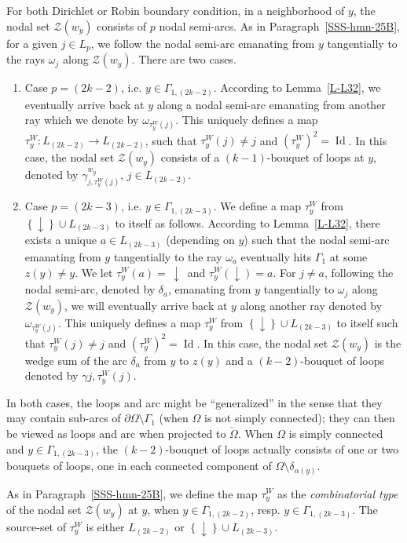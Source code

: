 \documentclass[12pt,a4paper]{amsart}
\theoremstyle{plain} %
\theoremstyle{definition}
\numberwithin{equation}{section}
\numberwithin{figure}{section}
\numberwithin{table}{section}
\newcommand{\cZ}{\mathcal{Z}}
\DeclareMathOperator{\id}{Id}
\newcommand{\sm}{\!\setminus\!}
\newcommand{\set}[1]{\left\lbrace #1 \right\rbrace}
\begin{document}
For both Dirichlet or Robin boundary condition, in a neighborhood of $y$,
the nodal set $\cZ(w_y)$ consists of $p$ nodal semi-arcs. As in Paragraph~\ref{SSS-hmn-25B}, for a given $j \in L_p$, we follow the
nodal semi-arc emanating from $y$ tangentially to the rays $\omega_j$
along $\cZ(w_y)$.  There are two cases.
\begin{enumerate}[$\diamond$]
\item Case $p=(2k-2)$, i.e. $y \in \Gamma_{1,(2k -2)}$. According to Lemma~\ref{L-L32}, we eventually arrive back at $y$ along a nodal semi-arc emanating from another ray which we denote by $\omega_{\tau_y^{W}(j)}$. This uniquely defines a map $\tau_y^{W} : L_{(2k-2)} \to L_{(2k-2)}$, such that $\tau_y^{W}(j) \neq j$ and $(\tau_y^{W})^2 = \id$. In this case, the nodal set $\cZ(w_y)$ consists of a $(k-1)$-bouquet of loops at $y$, denoted by $\gamma^{w_y}_{j,\tau_y^{W}(j)},\, j \in L_{(2k-2)}$.
  \item Case $p = (2k-3)$, i.e. $y \in \Gamma_{1,(2k -3)}$. We define a map $\tau_y^{W}$ from $\set{\downarrow} \cup L_{(2k-3)}$ to itself as follows. According to Lemma~\ref{L-L32}, there exists a unique $a \in L_{(2k-3)}$ (depending on $y$) such that the nodal semi-arc emanating from $y$ tangentially to the ray $\omega_{a}$ eventually hits $\Gamma_1$ at some $z(y) \neq y$. We let $\tau_y^{W}(a) = \,\downarrow$\, and $\tau_y^{W}(\downarrow)=a$. For $j \neq a$, following the nodal semi-arc, denoted by $\delta_a$, emanating from $y$ tangentially to $\omega_j$ along $\cZ(w_y)$, we will eventually arrive back at $y$ along another ray denoted by $\omega_{\tau_{y}^{W}(j)}$. This uniquely defines a map $\tau_{y}^{W}$ from $\set{\downarrow} \cup L_{(2k-3)}$ to itself such that $\tau_{y}^{W}(j) \neq j$ and $(\tau_{y}^{W})^2 = \id$. In this case, the nodal set $\cZ(w_y)$ is the wedge sum of the arc $\delta_{a}$ from $y$ to $z(y)$ and a $(k-2)$-bouquet of loops denoted by $\gamma{j,\tau_{y}^{W}(j)}$.
\end{enumerate}
In both cases, the loops and arc might be ``generalized'' in the sense that they may contain sub-arcs of $\partial \Omega \sm \Gamma_1$ (when $\Omega$ is not simply connected); they can then be viewed as loops and arc when projected to $\check{\Omega}$. When $\Omega$ is simply connected and $y \in \Gamma_{1,(2k -3)}$, the $(k-2)$-bouquet of loops actually consists of one or two bouquets of loops, one in each connected component of $\Omega \sm \delta_{\alpha(y)}$.\smallskip

 As in Paragraph~\ref{SSS-hmn-25B}, we define the map $\tau_y^{W}$ as the \emph{combinatorial type} of the nodal set $\cZ(w_y)$ at $y$, when $y \in \Gamma_{1,(2k-2)}$, resp. $y \in \Gamma_{1,(2k-3)}$. The source-set of $\tau_{y}^{W}$ is either $L_{(2k-2)}$ or $\set{\downarrow} \cup L_{(2k-3)}$.
\end{document}
